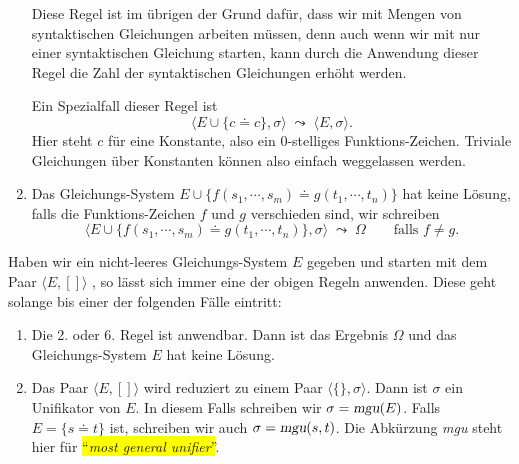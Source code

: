 \begin{enumerate}
      Diese Regel ist im \"{u}brigen der Grund daf\"{u}r, dass wir mit Mengen von syntaktischen Gleichungen
      arbeiten m\"{u}ssen, denn auch wenn wir mit nur einer syntaktischen Gleichung starten, kann 
      durch die Anwendung dieser Regel die Zahl der syntaktischen Gleichungen erh\"{o}ht werden.

      Ein Spezialfall dieser Regel ist 
      \[ \Big\langle E \cup \big\{ c \doteq c \big\}, \sigma \Big\rangle \;\leadsto\; 
         \Big\langle E, \sigma \Big\rangle.
      \]
      Hier steht $c$ f\"{u}r eine Konstante, also ein 0-stelliges Funktions-Zeichen. 
      Triviale Gleichungen \"{u}ber Konstanten k\"{o}nnen also einfach weggelassen werden.
\item Das Gleichungs-System $E \cup \big\{ f(s_1,\cdots,s_m) \doteq g(t_1,\cdots,t_n) \big\}$
      hat keine L\"{o}sung, falls die Funk\-tions-Zeichen $f$ und $g$ verschieden sind, wir schreiben
      \[ \Big\langle E \cup \big\{ f(s_1,\cdots,s_m) \doteq g(t_1,\cdots,t_n) \big\},
      \sigma \Big\rangle \;\leadsto\; \Omega \qquad \mbox{falls $f \not= g$}. \]
\end{enumerate}
Haben wir ein nicht-leeres Gleichungs-System $E$ gegeben und starten mit dem Paar 
$\langle E, []\rangle$  , so l\"{a}sst sich immer eine der
obigen Regeln anwenden.  Diese geht solange bis einer der folgenden F\"{a}lle eintritt:
\begin{enumerate}
\item Die 2. oder 6. Regel ist anwendbar.  Dann ist das Ergebnis $\Omega$ und das Gleichungs-System 
      $E$ hat keine L\"{o}sung.
\item Das Paar $\langle E, [] \rangle$ wird reduziert zu einem Paar $\langle \{\}, \sigma\rangle$.
      Dann ist $\sigma$ ein Unifikator von $E$.  In diesem Falls schreiben wir $\sigma = \textsl{mgu}(E)$.
      Falls $E = \{ s \doteq t \}$ ist, schreiben wir auch $\sigma = \textsl{mgu}(s, t)$.  Die Abk\"{u}rzung
      \textsl{mgu} steht hier f\"{u}r \colorbox{yellow}{``\emph{most general unifier}''}.
\end{enumerate}

